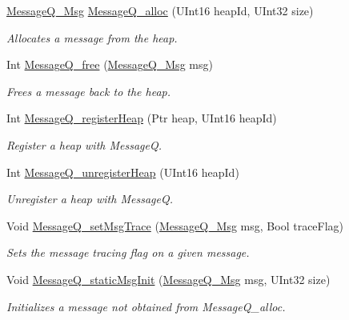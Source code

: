 \begin{DoxyCompactItemize}
\hyperlink{struct_message_q___msg_header}{MessageQ\_\-Msg} \hyperlink{_message_q_8h_ad8de6381a05a4d8a672d06a3b5676a24}{MessageQ\_\-alloc} (UInt16 heapId, UInt32 size)
\begin{DoxyCompactList}\small\item\em Allocates a message from the heap. \item\end{DoxyCompactList}\item 
Int \hyperlink{_message_q_8h_ac7ac95bf02e7366b353e728b15d76852}{MessageQ\_\-free} (\hyperlink{struct_message_q___msg_header}{MessageQ\_\-Msg} msg)
\begin{DoxyCompactList}\small\item\em Frees a message back to the heap. \item\end{DoxyCompactList}\item 
Int \hyperlink{_message_q_8h_ab74ba85e9c7ebbb1a888df871fd2a6c6}{MessageQ\_\-registerHeap} (Ptr heap, UInt16 heapId)
\begin{DoxyCompactList}\small\item\em Register a heap with MessageQ. \item\end{DoxyCompactList}\item 
Int \hyperlink{_message_q_8h_a4258fb35928047e54b625009c86ec4ba}{MessageQ\_\-unregisterHeap} (UInt16 heapId)
\begin{DoxyCompactList}\small\item\em Unregister a heap with MessageQ. \item\end{DoxyCompactList}\item 
Void \hyperlink{_message_q_8h_a74dc311c0b89f6fcbb309a5a98ab349f}{MessageQ\_\-setMsgTrace} (\hyperlink{struct_message_q___msg_header}{MessageQ\_\-Msg} msg, Bool traceFlag)
\begin{DoxyCompactList}\small\item\em Sets the message tracing flag on a given message. \item\end{DoxyCompactList}\item 
Void \hyperlink{_message_q_8h_a5b627fa66c267f53cccb0a960fe23a64}{MessageQ\_\-staticMsgInit} (\hyperlink{struct_message_q___msg_header}{MessageQ\_\-Msg} msg, UInt32 size)
\begin{DoxyCompactList}\small\item\em Initializes a message not obtained from MessageQ\_\-alloc. \item\end{DoxyCompactList}\item 

\end{DoxyCompactItemize}

